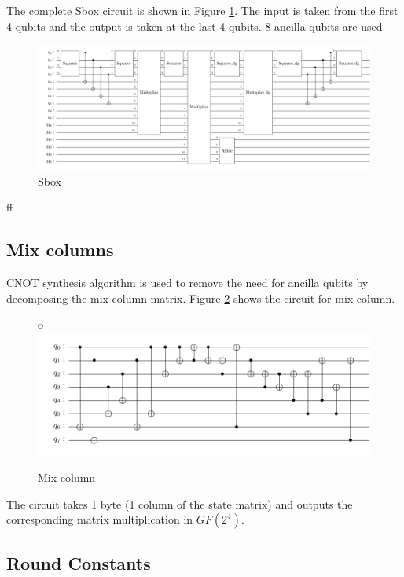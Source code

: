 \documentclass[preprint]{transcrypto}
\begin{document}
The complete Sbox circuit is shown in Figure \ref{fig:sb}. The input is taken from the first 4 qubits and the output is taken at the last 4 qubits. 8 ancilla qubits are used.


\begin{figure}[h!]
    \centering
    \includegraphics[width=1\linewidth]{saes18/sbox.pdf}
    \caption{Sbox}
    \label{fig:sb}
\end{figure}ff


\subsection{Mix columns}
CNOT synthesis algorithm is used to remove the need for ancilla qubits by decomposing the mix column matrix. Figure \ref{fig:mc} shows the circuit for mix column.

\begin{figure}[h!]o
    \centering
    \includegraphics[width=1\linewidth]{saes18/mc.pdf}
    \caption{Mix column}
    \label{fig:mc}
\end{figure}

The circuit takes 1 byte (1 column of the state matrix) and outputs the corresponding matrix multiplication in $GF(2^4)$.


\subsection{Round Constants}
\end{document}
